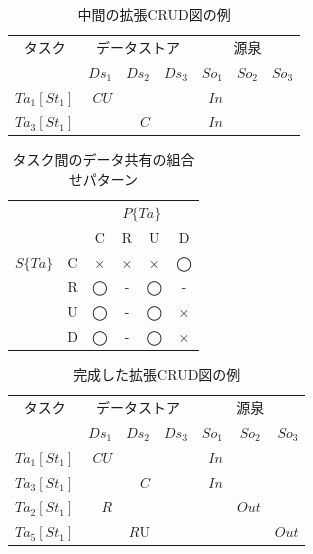 \documentclass[a4paper,12pt]{jreport}
\begin{document}
\begin{table}[t]
  \centering
  \caption{中間の拡張CRUD図の例}
    \begin{tabular}{r|r|r|r|r|r|r}
    \multicolumn{1}{c|}{タスク} & \multicolumn{3}{c|}{データストア} & \multicolumn{3}{c}{源泉} \\
\cline{2-7}    \multicolumn{1}{c|}{} & $Ds_1$ & $Ds_2$ & $Ds_3$ & $So_1$ & $So_2$ & $So_3$ \\
    \hline
    \hline
    $Ta_1[St_1]$ & $CU$ &   &   & $In$ &   &  \\
    \hline
    $Ta_3[St_1]$ &   & $C$ &   & $In$ &   &  \\
    \hline
    \end{tabular}%
 \label{CRUDIO2}
\end{table}%

\begin{table}[h]
\caption{タスク間のデータ共有の組合せパターン}
\label{table:3}
\begin{center}
\begin{tabular}{c|c||c|c|c|c}
\hline
\multicolumn{2}{c||}{}& \multicolumn{4}{c}{$P\{Ta\}$}\\
\multicolumn{2}{c||}{}& C & R & U& D\\
\hline\hline
$S\{Ta\}$&C&×&×&×&◯\\
\cline{2-6}
&R&◯&-&◯& -\\
\cline{2-6}
&U&◯&-&◯&×\\
\cline{2-6}
&D&◯&- &◯&×\\
\hline
\end{tabular}
\end{center}
\end{table}

\begin{table}[t]
  \centering
  \caption{完成した拡張CRUD図の例}
    \begin{tabular}{r|r|r|r|r|r|r}
    \multicolumn{1}{c|}{タスク} & \multicolumn{3}{c|}{データストア} & \multicolumn{3}{c}{源泉} \\
\cline{2-7}    \multicolumn{1}{c|}{} & $Ds_1$ & $Ds_2$ & $Ds_3$ & $So_1$ & $So_2$ & $So_3$ \\
    \hline
    \hline
    $Ta_1[St_1]$ & $CU$ &   &   & $In$ &   &  \\
    \hline
    $Ta_3[St_1]$ &   & $C$ &   & $In$ &   &  \\
    \hline
    $Ta_2[St_1]$ & $R$ &   &   &   & $Out$ &  \\
    \hline
    $Ta_5[St_1]$ &   & $R$U &   &   &   & $Out$ \\
    \end{tabular}%
  \label{excrud}%
\end{table}%
\end{document}
